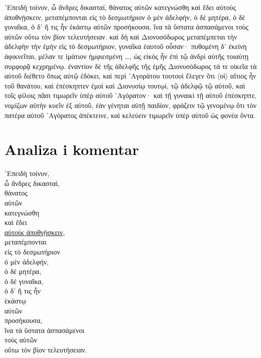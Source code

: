 {\large
\begin{greek}
\noindent ᾿Επειδὴ τοίνυν, ὦ ἄνδρες δικασταί, θάνατος αὐτῶν κατεγνώσθη καὶ ἔδει αὐτοὺς ἀποθνῄσκειν, μεταπέμπονται εἰς τὸ δεσμωτήριον ὁ μὲν ἀδελφήν, ὁ δὲ μητέρα, ὁ δὲ γυναῖκα, ὁ δ' ἥ τις ἦν ἑκάστῳ αὐτῶν προσήκουσα, ἵνα τὰ ὕστατα ἀσπασάμενοι τοὺς αὑτῶν οὕτω τὸν βίον τελευτήσειαν. καὶ δὴ καὶ Διονυσόδωρος μεταπέμπεται τὴν ἀδελφὴν τὴν ἐμὴν εἰς τὸ δεσμωτήριον, γυναῖκα ἑαυτοῦ οὖσαν· πυθομένη δ' ἐκείνη ἀφικνεῖται, μέλαν τε ἱμάτιον ἠμφιεσμένη \dots, ὡς εἰκὸς ἦν ἐπὶ τῷ ἀνδρὶ αὐτῆς τοιαύτῃ συμφορᾷ κεχρημένῳ. ἐναντίον δὲ τῆς ἀδελφῆς τῆς ἐμῆς Διονυσόδωρος τά τε οἰκεῖα τὰ αὑτοῦ διέθετο ὅπως αὐτῷ ἐδόκει, καὶ περὶ ᾿Αγοράτου τουτουὶ ἔλεγεν ὅτι $\langle$οἱ$\rangle$ αἴτιος ἦν τοῦ θανάτου, καὶ ἐπέσκηπτεν ἐμοὶ καὶ Διονυσίῳ τουτῳί, τῷ ἀδελφῷ τῷ αὑτοῦ, καὶ τοῖς φίλοις πᾶσι τιμωρεῖν ὑπὲρ αὑτοῦ ᾿Αγόρατον· καὶ τῇ γυναικὶ τῇ αὑτοῦ ἐπέσκηπτε, νομίζων αὐτὴν κυεῖν ἐξ αὑτοῦ, ἐὰν γένηται αὐτῇ παιδίον, φράζειν τῷ γενομένῳ ὅτι τὸν πατέρα αὐτοῦ ᾿Αγόρατος ἀπέκτεινε, καὶ κελεύειν τιμωρεῖν ὑπὲρ αὑτοῦ ὡς φονέα ὄντα.

\end{greek}

}

\section*{Analiza i komentar}



{\large
\noindent ᾿Επειδὴ τοίνυν, \\
\tabto{2em} ὦ ἄνδρες δικασταί, \\
θάνατος \\
\tabto{2em} αὐτῶν \\
κατεγνώσθη \\
καὶ ἔδει \\
\tabto{2em} \underline{αὐτοὺς ἀποθνῄσκειν}, \\
μεταπέμπονται \\
\tabto{2em} εἰς τὸ δεσμωτήριον \\
ὁ μὲν ἀδελφήν, \\
ὁ δὲ μητέρα, \\
ὁ δὲ γυναῖκα, \\
ὁ δ' ἥ τις ἦν \\
\tabto{4em} ἑκάστῳ \\
\tabto{6em} αὐτῶν \\
\tabto{2em} προσήκουσα, \\
\tabto{2em} ἵνα τὰ ὕστατα ἀσπασάμενοι \\
\tabto{4em} τοὺς αὑτῶν \\
\tabto{2em} οὕτω τὸν βίον τελευτήσειαν.\\

}

